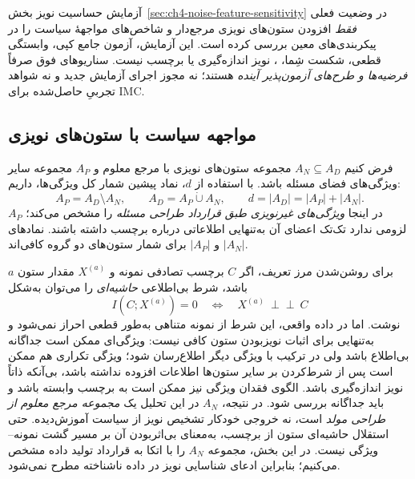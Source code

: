 آزمایش حساسیت نویز
بخش~\ref{sec:ch4-noise-feature-sensitivity}
در وضعیت فعلی \emph{فقط}
افزودن ستون‌های نویزی مرجع‌دار
و شاخص‌های مواجههٔ سیاست را
در پیکربندی‌های معین بررسی کرده است.
این آزمایش، آزمون جامع
کپی، وابستگی قطعی، شکست شِما،
، نویز
اندازه‌گیری یا برچسب نیست.
سناریوهای فوق صرفاً
\emph{فرضیه‌ها و طرح‌های
آزمون‌پذیر آینده} هستند؛
نه مجوز اجرای آزمایش جدید و
نه شواهد تجربیِ حاصل‌شده برای IMC.

\subsection{مواجهه سیاست با ستون‌های نویزی}
\label{cmp:subsec:ch3-noise-selection}
فرض کنیم $A_N\subseteq A_D$ مجموعه
ستون‌های نویزی با مرجع معلوم
و $A_P$ مجموعه سایر ویژگی‌های
فضای مسئله باشد. با استفاده از
$d$، نماد پیشین شمار کل ویژگی‌ها،
داریم:
\begin{equation}\label{cmp:eq:ch3-noise-feature-sets}
\boxed{
A_P=A_D\setminus A_N,\qquad
A_D=A_P\mathbin{\dot\cup}A_N,\qquad
d=|A_D|=|A_P|+|A_N|.
}
\end{equation}
$A_P$ در اینجا \emph{ویژگی‌های غیرنویزی
طبق قرارداد طراحی مسئله} را مشخص می‌کند؛
لزومی ندارد تک‌تک اعضای آن به‌تنهایی
اطلاعاتی درباره برچسب داشته باشند.
نمادهای $|A_N|$ و $|A_P|$
برای شمار ستون‌های دو گروه کافی‌اند.

برای روشن‌شدن مرز تعریف، اگر $C$ برچسب تصادفی
نمونه و $X^{(a)}$ مقدار ستون $a$ باشد،
شرط بی‌اطلاعی \emph{حاشیه‌ای} را می‌توان به‌شکل
\begin{equation}\label{cmp:eq:ch3-noise-marginal-independence}
I(C;X^{(a)})=0
\quad\Longleftrightarrow\quad
X^{(a)}\ \perp\!\!\!\perp\ C
\end{equation}
نوشت. اما در داده واقعی، این شرط از نمونه
متناهی به‌طور قطعی احراز نمی‌شود و
به‌تنهایی برای اثبات نویزبودن ستون کافی نیست:
ویژگی‌ای ممکن است جداگانه بی‌اطلاع باشد ولی
در ترکیب با ویژگی دیگر اطلاع‌رسان شود؛
ویژگی تکراری هم ممکن است پس از شرط‌کردن بر سایر
ستون‌ها اطلاعات افزوده نداشته باشد، بی‌آنکه
ذاتاً نویز اندازه‌گیری باشد.
الگوی فقدان ویژگی نیز ممکن است به برچسب
وابسته باشد و باید جداگانه بررسی شود.
در نتیجه، $A_N$ در این تحلیل یک
\emph{مجموعه مرجع معلوم از طراحی مولد} است،
نه خروجی خودکار تشخیص نویز از سیاست آموزش‌دیده.
حتی استقلال حاشیه‌ای ستون از برچسب،
به‌معنای بی‌اثربودن آن بر مسیر گشت
نمونه--ویژگی نیست. در این بخش،
مجموعه $A_N$ را با اتکا به
قرارداد تولید داده مشخص می‌کنیم؛
بنابراین ادعای شناسایی نویز
در داده ناشناخته مطرح نمی‌شود.


